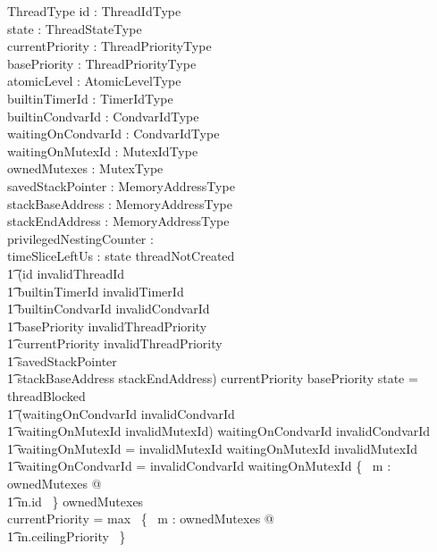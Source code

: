 \documentclass{AUJarticle}
\begin{document}
\begin{schema}{ThreadType}
   id : ThreadIdType \\
   state : ThreadStateType \\
   currentPriority : ThreadPriorityType \\
   basePriority : ThreadPriorityType \\
   atomicLevel : AtomicLevelType \\
   builtinTimerId : TimerIdType \\
   builtinCondvarId : CondvarIdType \\
   waitingOnCondvarId : CondvarIdType \\
   waitingOnMutexId : MutexIdType \\
   ownedMutexes : \finset MutexType \\
   savedStackPointer : MemoryAddressType \\
   stackBaseAddress : MemoryAddressType \\
   stackEndAddress : MemoryAddressType \\
   privilegedNestingCounter : \nat \\
   timeSliceLeftUs : \nat
\where
   state \neq threadNotCreated \implies \\
   \t1 (id \neq invalidThreadId \land \\
   \t1 builtinTimerId \neq invalidTimerId \land \\
   \t1 builtinCondvarId \neq invalidCondvarId \land \\
   \t1 basePriority \neq invalidThreadPriority \land \\
   \t1 currentPriority \neq invalidThreadPriority \land \\
   \t1 savedStackPointer \in \\
   \t1 stackBaseAddress \upto stackEndAddress)
\also
   currentPriority \geq basePriority
\also
   state = threadBlocked \iff \\
   \t1 (waitingOnCondvarId \neq invalidCondvarId \lor \\
   \t1  waitingOnMutexId \neq invalidMutexId)
\also
   waitingOnCondvarId \neq invalidCondvarId \implies \\
   \t1 waitingOnMutexId = invalidMutexId
\also
   waitingOnMutexId \neq invalidMutexId \implies \\
   \t1 waitingOnCondvarId = invalidCondvarId
\also
   waitingOnMutexId \notin \{~ m : ownedMutexes @ \\
   \t1 m.id ~\}
\also
   ownedMutexes \neq \emptyset \implies \\
   currentPriority = max~ \{~ m : ownedMutexes @ \\
   \t1 m.ceilingPriority ~\}
\end{schema}
\end{document}
